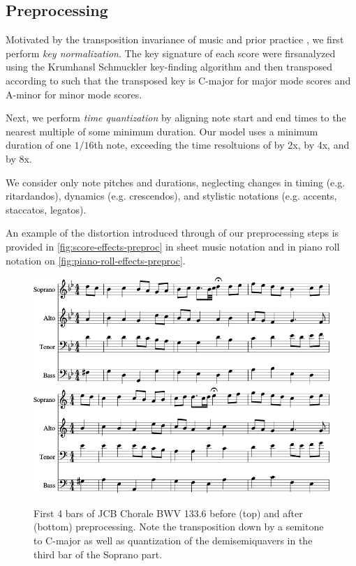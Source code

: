 \subsection{Preprocessing}

Motivated by the transposition invariance of music and prior practice
\citep{mozer1994neural} \citep{Eck2002} \citep{franklin2004recurrent}
\citep{franklin2005jazz}, we first perform \emph{key normalization}.
The key signature of each score were firsanalyzed using the Krumhansl
Schmuckler key-finding algorithm \citep{krumhansl2001cognitive} and then
transposed according to  such that the transposed key is
C-major for major mode scores and A-minor for minor mode scores.

Next, we perform \emph{time quantization} by aligning note start and end times
to the nearest multiple of some minimum duration. Our model uses a minimum
duration of one $1/16$th note, exceeding the time resoltuions of
\citep{Boulanger-Lewandowski2012} \citep{Eck2002} by 2x,
\citep{hild1991harmonet} by 4x, and \citep{bellgard1994harmonizing} by 8x.

We consider only note pitches and durations, neglecting changes in timing
(e.g. ritardandos), dynamics (e.g. crescendos), and stylistic notations (e.g.
accents, staccatos, legatos).

An example of the distortion introduced through of our preprocessing steps is
provided in \vref{fig:score-effects-preproc} in sheet music notation and in
piano roll notation on
\vref{fig:piano-roll-effects-preproc}.
\begin{figure}[p]
    \centering
    \includegraphics[width=0.8\linewidth]{bwv185-6-original-score-1.png}
    \vspace{1cm}
    \includegraphics[width=0.8\linewidth]{bwv185-6-preproc-score-1.png}
    \caption{First 4 bars of JCB Chorale BWV 133.6 before (top) and after (bottom) preprocessing. Note
    the transposition down by a semitone to C-major as well as quantization of the
    demisemiquavers in the third bar of the Soprano part.}
    \label{fig:score-effects-preproc}
\end{figure}

